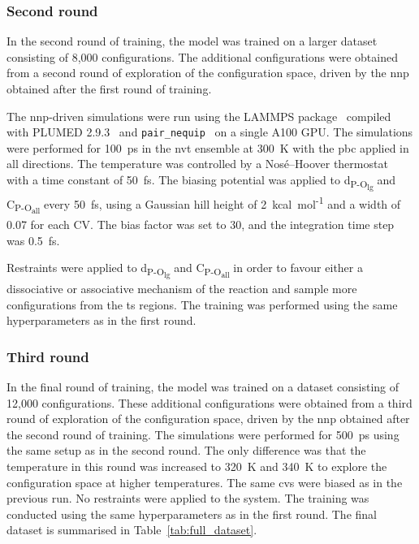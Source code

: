 \subsubsection{Second round}
In the second round of training, the model was trained on a larger dataset consisting of 8,000 configurations. The additional configurations were obtained from a second round of exploration of the configuration space, driven by the \ac{nnp} obtained after the first round of training.

The \ac{nnp}-driven simulations were run using the LAMMPS package~\citep{thompsonLAMMPSFlexibleSimulation2022} compiled with PLUMED 2.9.3~\citep{tribelloPLUMED2New2014} and \texttt{pair\_nequip}~\citep{MirgroupPair_nequip} on a single A100 GPU. The simulations were performed for 100~ps in the \ac{nvt} ensemble at 300~K with the \ac{pbc} applied in all directions. The temperature was controlled by a Nos\'e--Hoover thermostat~\citep{noseUnifiedFormulationConstant1984, hooverCanonicalDynamicsEquilibrium1985} with a time constant of 50~fs. The biasing potential was applied to d\textsubscript{P-O\textsubscript{lg}} and C\textsubscript{P-O\textsubscript{all}} every 50~fs, using a Gaussian hill height of 2~kcal~mol\textsuperscript{-1} and a width of 0.07 for each CV. The bias factor was set to 30, and the integration time step was 0.5~fs.

Restraints were applied to d\textsubscript{P-O\textsubscript{lg}} and C\textsubscript{P-O\textsubscript{all}} in order to favour either a dissociative or associative mechanism of the reaction and sample more configurations from the \ac{ts} regions. The training was performed using the same hyperparameters as in the first round.



\subsubsection{Third round}
In the final round of training, the model was trained on a dataset consisting of 12,000 configurations. These additional configurations were obtained from a third round of exploration of the configuration space, driven by the \ac{nnp} obtained after the second round of training. The simulations were performed for 500~ps using the same setup as in the second round. The only difference was that the temperature in this round was increased to 320~K and 340~K to explore the configuration space at higher temperatures. The same \acp{cv} were biased as in the previous run. No restraints were applied to the system. The training was conducted using the same hyperparameters as in the first round. The final dataset is summarised in Table~\ref{tab:full_dataset}.



